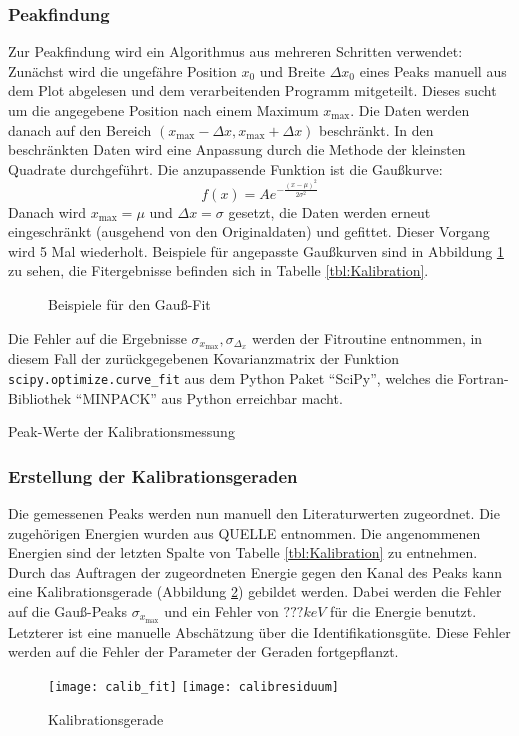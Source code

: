 \documentclass{../Misc/MontavonLaTeX/Montavon}
\newcommand{\halfwidth}{0.48\textwidth}
\begin{document}
\subsubsection{Peakfindung}
Zur Peakfindung wird ein Algorithmus aus mehreren Schritten verwendet:
Zunächst wird die ungefähre Position $x_0$ und Breite $\Delta x_0$ eines Peaks manuell aus dem Plot abgelesen und dem verarbeitenden Programm mitgeteilt. Dieses sucht um die angegebene Position nach einem Maximum $x_\textrm{max}$. 
Die Daten werden danach auf den Bereich $(x_\textrm{max} - \Delta x, x_\textrm{max} + \Delta x)$ beschränkt.
In den beschränkten Daten wird eine Anpassung durch die Methode der kleinsten Quadrate durchgeführt. Die anzupassende Funktion ist die Gaußkurve:
\[
	f(x) = A e^{-\frac{(x-\mu)^2}{2 \sigma^2}}
\]
Danach wird $x_\textrm{max} = \mu$ und $\Delta x = \sigma$ gesetzt, die Daten werden erneut eingeschränkt (ausgehend von den Originaldaten) und gefittet.
Dieser Vorgang wird 5 Mal wiederholt. 
Beispiele für angepasste Gaußkurven sind in Abbildung \ref{fig:GaussFit} zu sehen, die Fitergebnisse befinden sich in Tabelle \ref{tbl:Kalibration}.
\begin{figure}[htbp]
\caption{Beispiele für den Gauß-Fit}
\label{fig:GaussFit}
\end{figure}
Die Fehler auf die Ergebnisse $\sigma_{x_\textrm{max}}, \sigma_{\Delta_x}$ werden der Fitroutine entnommen, in diesem Fall der zurückgegebenen Kovarianzmatrix der Funktion \texttt{scipy.optimize.curve\_fit} aus dem Python Paket \enquote{SciPy}, welches die Fortran-Bibliothek \enquote{MINPACK} aus Python erreichbar macht.
\begin{table}[htbp]
\centering
\small
\caption{Peak-Werte der Kalibrationsmessung}
\label{tbl:Kalibration}
\end{table}

\subsubsection{Erstellung der Kalibrationsgeraden}
Die gemessenen Peaks werden nun manuell den Literaturwerten zugeordnet. Die zugehörigen Energien wurden aus QUELLE entnommen. Die angenommenen Energien sind der letzten Spalte von Tabelle \ref{tbl:Kalibration} zu entnehmen. 
Durch das Auftragen der zugeordneten Energie gegen den Kanal des Peaks kann eine Kalibrationsgerade (Abbildung \ref{fig:Kalibrationsgerade}) gebildet werden. Dabei werden die Fehler auf die Gauß-Peaks $\sigma_{x_\textrm{max}}$ und ein Fehler von $??? \unit{keV}$ für die Energie benutzt. Letzterer ist eine manuelle Abschätzung über die Identifikationsgüte.
Diese Fehler werden auf die Fehler der Parameter der Geraden fortgepflanzt.
\begin{figure}[htbp]
\centering
\texttt{[image: calib\_fit]}
\texttt{[image: calibresiduum]}
\caption{Kalibrationsgerade}
\label{fig:Kalibrationsgerade}
\end{figure}
\end{document}
